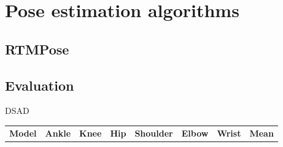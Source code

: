 
\chapter{Pose estimation algorithms}

\section{RTMPose}

\section{Evaluation}

DSAD


\begin{tabular}{p{3.5cm} rrrrrrr}
    \toprule
    \textbf{Model}                   & \textbf{Ankle} & \textbf{Knee} & \textbf{Hip} & \textbf{Shoulder} & \textbf{Elbow} & \textbf{Wrist} & \textbf{Mean} \\


\end{tabular}
